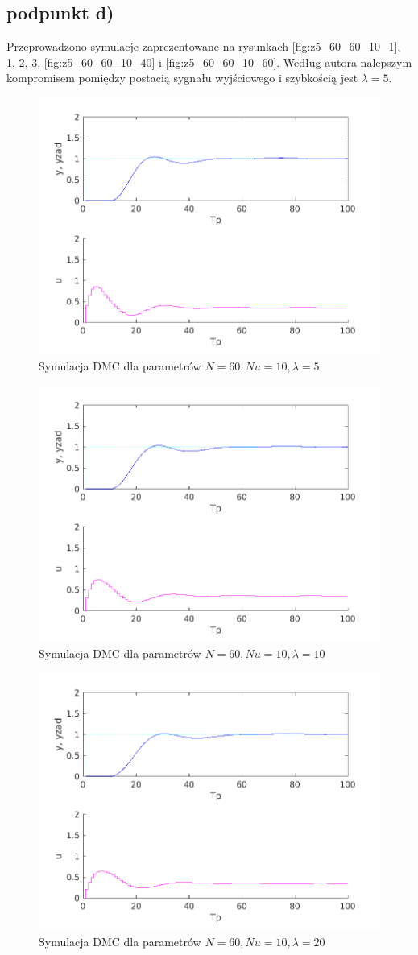 \documentclass[a4paper, 10pt]{article}
\begin{document}
\subsection{podpunkt d)}
Przeprowadzono symulacje zaprezentowane na rysunkach \ref{fig:z5_60_60_10_1}, \ref{fig:z5_60_60_10_5}, \ref{fig:z5_60_60_10_10}, \ref{fig:z5_60_60_10_20}, \ref{fig:z5_60_60_10_40} i \ref{fig:z5_60_60_10_60}. Według autora nalepszym kompromisem pomiędzy postacią sygnału wyjściowego i szybkością jest $\lambda = 5$. 
\begin{figure}
	\centering
	\includegraphics[width=0.7\linewidth]{z5_60_60_10_5.png}
	\caption{Symulacja DMC dla parametrów $N=60, Nu = 10, \lambda = 5$}
	\label{fig:z5_60_60_10_5}
\end{figure}
\begin{figure}
	\centering
	\includegraphics[width=0.7\linewidth]{z5_60_60_10_10.png}
	\caption{Symulacja DMC dla parametrów $N=60, Nu = 10, \lambda = 10$}
	\label{fig:z5_60_60_10_10}
\end{figure}
\begin{figure}
	\centering
	\includegraphics[width=0.7\linewidth]{z5_60_60_10_20.png}
	\caption{Symulacja DMC dla parametrów $N=60, Nu = 10, \lambda = 20$}
	\label{fig:z5_60_60_10_20}
\end{figure}
\end{document}
